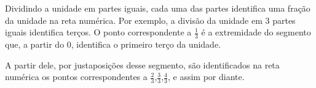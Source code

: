 \documentclass[a4,12pt]{book}
\begin{document}
Dividindo a unidade em partes iguais,  cada uma das partes identifica uma fração da unidade na reta numérica.
Por exemplo, a divisão da unidade em 3 partes iguais identifica terços. O ponto correspondente a $\frac{1}{3}$  é a extremidade do segmento que, a partir do 0, identifica o primeiro terço da unidade. 

\begin{center}
\end{center}


A partir dele, por justaposições desse segmento, são identificados na reta numérica os pontos correspondentes a $\frac{2}{3}$,$\frac{3}{3}$,$\frac{4}{3}$, e assim por diante. 
\end{document}
